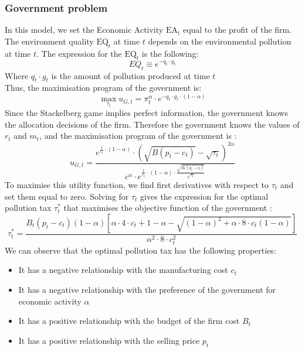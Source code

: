 \documentclass{article}
\begin{document}
\subsubsection{Government problem}
In this model, we set the Economic Activity $\text{EA}_{t}$ equal to the profit of the firm.
The environment quality $\text{EQ}_{t}$ at time $t$ depends on the environmental pollution at time $t$. The expression for the $\text{EQ}_{t}$ is the following: 
\begin{equation}
    EQ_{t}\equiv e^{-q_{t}\cdot g_{t}}
\end{equation}
Where $q_{t}\cdot g_{t}$ is the amount of pollution produced at time $t$ \\
Thus, the maximisation program of the government is: 
\begin{equation*}
    \max_{\tau_{t}}{u_{G,t}=\pi_{t}^{\alpha}\cdot e^{-q_{t}\cdot g_{t}\cdot(1-\alpha)}}
\end{equation*}
Since the Stackelberg game implies perfect information, the government knows the allocation decisions of the firm. Therefore  the government knows the values of $r_{t}$ and $m_{t}$, and the maximisation program of the government is \footnotemark[6]: 
\begin{equation}
    u_{G,t}=\frac{e^{\frac{1}{c_{t}}\cdot\left(1-\alpha\right)}\cdot\left(\sqrt{B(p_{t}-c_{t})}-\sqrt{\tau_{t}}\right)^{2\alpha}}{c^{\alpha}\cdot e^{\frac{1}{c_{t}}\cdot(1-\alpha)\cdot\frac{\sqrt{B_{t}(p_{t}-c_{t})}}{\sqrt{\tau_{t}}}}}
\end{equation}
To maximise this utility function, we find first derivatives with respect to $\tau_{t}$ and set them equal to zero. Solving for $\tau_{t}$ gives the expression for the optimal pollution tax $\tau_{t}^{*}$ that maximises the objective function of the government \footnotemark[7] : 
\begin{equation}
    \tau_{t}^{*}=\frac{B_{t}\left(p_{t}-c_{t}\right)(1-\alpha)\left[{\alpha \cdot 4\cdot c_{t}+1-\alpha}-\sqrt{(1-\alpha)^{2}+\alpha\cdot8\cdot c_{t}(1-\alpha)}\right]} {\alpha^{2} \cdot 8\cdot c_{t}^{2}}
\end{equation}
We can observe that the optimal pollution tax has the following properties: 
\begin{itemize}
    \item It has a negative relationship with the manufacturing cost $c_{t}$
    \item It has a negative relationship with the preference of the government for economic activity $\alpha$
    \item It has a positive relationship with the budget of the firm cost $B_{t}$
    \item It has a positive relationship with the selling price $p_{t}$
\end{itemize}
\pagebreak
\end{document}
